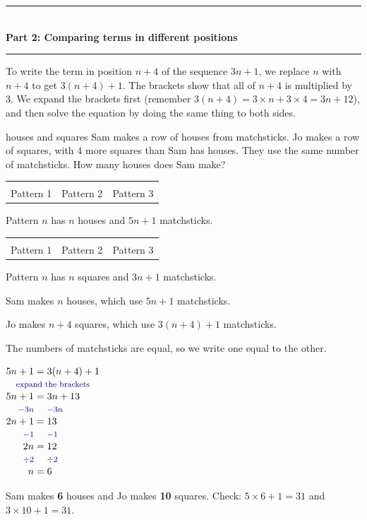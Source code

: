 \documentclass[11pt,a4paper]{article}
\makeatletter
\newcommand{\parttitle}[2]{%
  \vspace{1pt}
  {\color{blue!45!black}\rule{\linewidth}{1pt}}\\[1pt]
  {\large\bfseries Part #1: #2}\\[-6pt]
  {\color{blue!45!black}\rule{\linewidth}{0.4pt}}
  \par\vspace{-5pt}}
\newenvironment{working}
  {\(\renewcommand{\arraystretch}{1.06}\begin{array}{@{}r@{\;}c@{\;}l@{}}}
  {\end{array}\)}
\newcommand{\opstyle}[1]{\text{\footnotesize\color{blue!55!black}$#1$}}
\newcommand{\bsop}[1]{\opstyle{#1} & & \opstyle{#1}\\}
\newcommand{\bsnote}[1]{\multicolumn{3}{c}{\text{\footnotesize\color{blue!55!black}#1}}\\}
\newcommand{\eqlayout}[4]{%
  \begin{minipage}[c]{#1\linewidth}\raggedright #2\end{minipage}\hfill
  \begin{minipage}[c]{\dimexpr0.98\linewidth-#1\linewidth\relax}\centering #3\end{minipage}\par\smallskip
  #4}
\newcommand{\pic}[1]{\begin{tikzpicture}[baseline=(current bounding box.south)]#1\end{tikzpicture}}
\newcommand{\stick}[2]{\draw[stick] (#1) -- (#2);}
\newcommand{\squaregroup}[1]{%
  \stick{0.5*#1-0.5,0}{0.5*#1,0}\stick{0.5*#1-0.5,0.5}{0.5*#1,0.5}
  \stick{0.5*#1,0}{0.5*#1,0.5}}
\newcommand{\chainsquares}[1]{\pic{%
  \stick{0,0}{0,0.5}
  \foreach \k in {1,...,#1} {\squaregroup{\k}}}}
\newcommand{\housegroup}[1]{%
  \stick{0.5*#1-0.5,0}{0.5*#1,0}\stick{0.5*#1-0.5,0.5}{0.5*#1,0.5}
  \stick{0.5*#1,0}{0.5*#1,0.5}
  \stick{0.5*#1-0.5,0.5}{0.5*#1-0.25,0.79}\stick{0.5*#1-0.25,0.79}{0.5*#1,0.5}}
\newcommand{\chainhouses}[1]{\pic{%
  \stick{0,0}{0,0.5}
  \foreach \k in {1,...,#1} {\housegroup{\k}}}}
\newcommand{\threepatterns}[3]{%
  \begin{tabular}{@{}c@{\hspace{10pt}}c@{\hspace{10pt}}c@{}}
    #1 & #2 & #3\\[-1pt]
    {\scriptsize Pattern 1} & {\scriptsize Pattern 2} & {\scriptsize Pattern 3}
  \end{tabular}}
\makeatother
\begin{document}
\parttitle{2}{Comparing terms in different positions}

\begin{keyidea}
To write the term in position $n+4$ of the sequence $3n+1$, we replace $n$ with
$n+4$ to get $3(n+4)+1$. The brackets show that all of $n+4$ is multiplied by 3.
We expand the brackets first (remember $3(n+4)=3\times n+3\times4=3n+12$), and then
solve the equation by doing the same thing to both sides.
\end{keyidea}

\begin{wex}{houses and squares}
Sam makes a row of houses from matchsticks. Jo makes a row of squares, with 4 more
squares than Sam has houses. They use the same number of matchsticks. How many
houses does Sam make?\par\smallskip
\begin{minipage}[t]{0.49\linewidth}\centering
  \threepatterns{\chainhouses{1}}{\chainhouses{2}}{\chainhouses{3}}\par
  {\small Pattern $n$ has $n$ houses and $5n+1$ matchsticks.}
\end{minipage}\hfill
\begin{minipage}[t]{0.49\linewidth}\centering
  \threepatterns{\chainsquares{1}}{\chainsquares{2}}{\chainsquares{3}}\par
  {\small Pattern $n$ has $n$ squares and $3n+1$ matchsticks.}
\end{minipage}\par\medskip
\eqlayout{0.6}
  {Sam makes $n$ houses, which use $5n+1$ matchsticks.\par\smallskip
   Jo makes $n+4$ squares, which use $3(n+4)+1$ matchsticks.\par\smallskip
   The numbers of matchsticks are equal, so we write one equal to the other.}
  {\begin{working}
     5n+1 & = & 3(n+4)+1\\ \bsnote{expand the brackets}
     5n+1 & = & 3n+13\\ \bsop{-3n}
     2n+1 & = & 13\\ \bsop{-1}
     2n & = & 12\\ \bsop{\div 2}
     n & = & 6
   \end{working}}
  {Sam makes \textbf{6} houses and Jo makes \textbf{10} squares. Check: $5\times6+1=31$ and $3\times10+1=31$.}
\end{wex}
\end{document}
